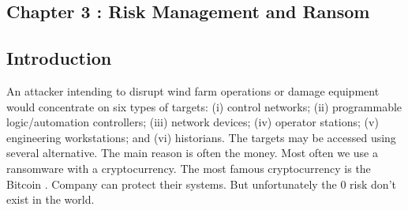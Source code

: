 \documentclass[twosided,a4,10pt]{article}
\begin{document}
\begin{multicols}{2}
 
\section{Chapter 3 : Risk Management and Ransom } 
\subsection{Introduction}
An attacker intending to disrupt wind farm operations or damage equipment would concentrate on six types of targets: (i) control networks; (ii) programmable logic/automation controllers; (iii) network devices; (iv) operator stations; (v) engineering workstations; and (vi) historians. The targets may be accessed using several alternative. The main reason is often the money. Most often we use a ransomware with a cryptocurrency. The most famous cryptocurrency is the Bitcoin . Company can protect their systems. But unfortunately the 0 risk don't exist in the world.


\end{multicols}
\end{document}

